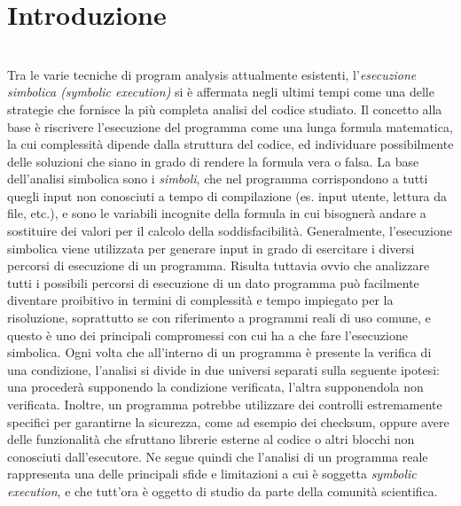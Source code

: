 \documentclass[Lau, oneside]{sapthesis}%
\begin{document}
\chapter{Introduzione}
\ \\
Tra le varie tecniche di program analysis attualmente esistenti, l'\textit{esecuzione simbolica (symbolic execution)} si è affermata negli ultimi tempi come una delle strategie che fornisce la più completa analisi del codice studiato.
\newline
Il concetto alla base è riscrivere l'esecuzione del programma come una lunga formula matematica, la cui complessità dipende dalla struttura del codice, ed individuare possibilmente delle soluzioni che siano in grado di rendere la formula vera o falsa.
\newline \newline
La base dell'analisi simbolica sono i \textit{simboli}, che nel programma corrispondono a tutti quegli input non conosciuti a tempo di compilazione (es. input utente, lettura da file, etc.), e sono le variabili incognite della formula in cui bisognerà andare a sostituire dei valori per il calcolo della soddisfacibilità.
\newline \newline
Generalmente, l'esecuzione simbolica viene utilizzata per generare input in grado di esercitare i diversi percorsi di esecuzione di un programma.
\newline
Risulta tuttavia ovvio che analizzare tutti i possibili percorsi di esecuzione di un dato programma può facilmente diventare proibitivo in termini di complessità e tempo impiegato per la risoluzione, soprattutto se con riferimento a programmi reali di uso comune, e questo è uno dei principali compromessi con cui ha a che fare l'esecuzione simbolica.
\newline
Ogni volta che all'interno di un programma è presente la verifica di una condizione, l'analisi si divide in due universi separati sulla seguente ipotesi: una procederà supponendo la condizione verificata, l'altra supponendola non verificata.
\newline
Inoltre, un programma potrebbe utilizzare dei controlli estremamente specifici per garantirne la sicurezza, come ad esempio dei checksum, oppure avere delle funzionalità che sfruttano librerie esterne al codice o altri blocchi non conosciuti dall'esecutore.
\newline \newline
Ne segue quindi che l'analisi di un programma reale rappresenta una delle principali sfide e limitazioni a cui è soggetta \textit{symbolic execution}, e che tutt'ora è oggetto di studio da parte della comunità scientifica.
\end{document}

